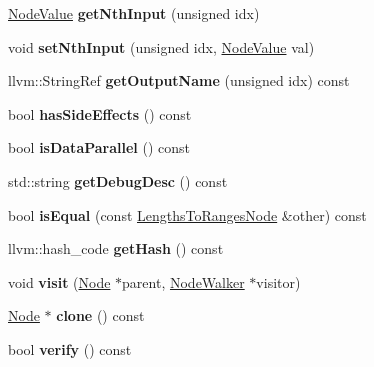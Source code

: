 \begin{DoxyCompactItemize}
\hyperlink{structglow_1_1_node_value}{Node\+Value} {\bfseries get\+Nth\+Input} (unsigned idx)
\item 
\mbox{\label{classglow_1_1_lengths_to_ranges_node_ae6801d5a973679510488ba4881f22b64}} 
void {\bfseries set\+Nth\+Input} (unsigned idx, \hyperlink{structglow_1_1_node_value}{Node\+Value} val)
\item 
\mbox{\label{classglow_1_1_lengths_to_ranges_node_a787a0ce03c9d00727a910fc17598b6fa}} 
llvm\+::\+String\+Ref {\bfseries get\+Output\+Name} (unsigned idx) const
\item 
\mbox{\label{classglow_1_1_lengths_to_ranges_node_a34f62b4c1e09f0ec06cfb895be4c24b9}} 
bool {\bfseries has\+Side\+Effects} () const
\item 
\mbox{\label{classglow_1_1_lengths_to_ranges_node_accd1a96ef1530b18a5d23ef168d79021}} 
bool {\bfseries is\+Data\+Parallel} () const
\item 
\mbox{\label{classglow_1_1_lengths_to_ranges_node_aae83d2c758a0e4613f563ebdba0f8da2}} 
std\+::string {\bfseries get\+Debug\+Desc} () const
\item 
\mbox{\label{classglow_1_1_lengths_to_ranges_node_af91b36239f3609cfdc992b7df183f981}} 
bool {\bfseries is\+Equal} (const \hyperlink{classglow_1_1_lengths_to_ranges_node}{Lengths\+To\+Ranges\+Node} \&other) const
\item 
\mbox{\label{classglow_1_1_lengths_to_ranges_node_a5617d223b9c6f10c481f162d07bb8e15}} 
llvm\+::hash\+\_\+code {\bfseries get\+Hash} () const
\item 
\mbox{\label{classglow_1_1_lengths_to_ranges_node_a8939e166caf187da8de070eca3e3b6b1}} 
void {\bfseries visit} (\hyperlink{classglow_1_1_node}{Node} $\ast$parent, \hyperlink{classglow_1_1_node_walker}{Node\+Walker} $\ast$visitor)
\item 
\mbox{\label{classglow_1_1_lengths_to_ranges_node_aa9f61c600aaed4abd4d31fae8efc9cc6}} 
\hyperlink{classglow_1_1_node}{Node} $\ast$ {\bfseries clone} () const
\item 
\mbox{\label{classglow_1_1_lengths_to_ranges_node_afc3adce0cb09417f6ac38719bf5bb2e0}} 
bool {\bfseries verify} () const
\end{DoxyCompactItemize}
